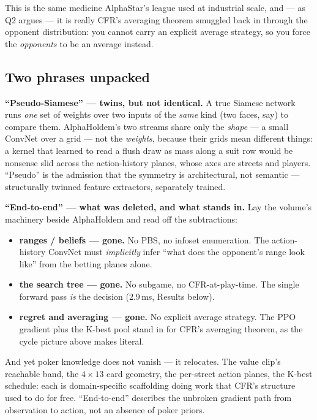 \documentclass[11pt,a4paper]{article}
\begin{document}
This is the same medicine AlphaStar's league used at industrial scale, and ---
as Q2 argues --- it is really CFR's averaging theorem smuggled back in through the
opponent distribution: you cannot carry an explicit average strategy, so you force
the \emph{opponents} to be an average instead.

\subsection{Two phrases unpacked}

\textbf{``Pseudo-Siamese'' --- twins, but not identical.} A true Siamese network
runs \emph{one} set of weights over two inputs of the \emph{same} kind (two faces,
say) to compare them. AlphaHoldem's two streams share only the \emph{shape} --- a
small ConvNet over a grid --- not the \emph{weights}, because their grids mean
different things: a kernel that learned to read a flush draw as mass along a suit
row would be nonsense slid across the action-history planes, whose axes are
streets and players. ``Pseudo'' is the admission that the symmetry is
architectural, not semantic --- structurally twinned feature extractors,
separately trained.

\textbf{``End-to-end'' --- what was deleted, and what stands in.} Lay the volume's
machinery beside AlphaHoldem and read off the subtractions:

\begin{itemize}[leftmargin=1.4em, itemsep=2pt]
\item \textbf{ranges / beliefs --- gone.} No PBS, no infoset enumeration. The
  action-history ConvNet must \emph{implicitly} infer ``what does the opponent's
  range look like'' from the betting planes alone.
\item \textbf{the search tree --- gone.} No subgame, no CFR-at-play-time. The
  single forward pass \emph{is} the decision (2.9\,ms, Results below).
\item \textbf{regret and averaging --- gone.} No explicit average strategy. The
  PPO gradient plus the K-best pool stand in for CFR's averaging theorem, as the
  cycle picture above makes literal.
\end{itemize}

And yet poker knowledge does not vanish --- it relocates. The value clip's
reachable band, the $4\times13$ card geometry, the per-street action planes, the
K-best schedule: each is domain-specific scaffolding doing work that CFR's
structure used to do for free. ``End-to-end'' describes the unbroken gradient path
from observation to action, not an absence of poker priors.
\end{document}
